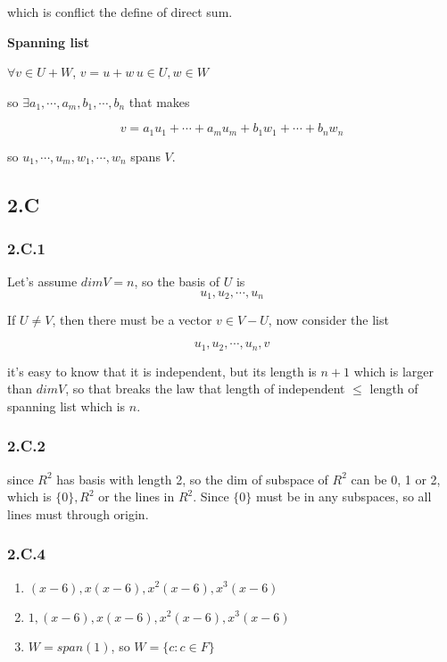 which is conflict the define of direct sum.

\textbf{Spanning list}

$\forall v\in U+W$, $v = u+w\, u\in U, w\in W$

so $\exists a_{1},\cdots,a_{m}, b_{1},\cdots, b_{n}$ that makes

\[ v = a_{1}u_{1}+\cdots+a_{m}u_{m} + b_{1}w_{1} + \cdots +b_{n}w_{n}\]

so $u_{1},\cdots, u_{m}, w_{1}, \cdots,w_{n}$ spans $V$.

\subsection*{2.C}
\subsubsection*{2.C.1}

Let's assume $dim V = n$, so the basis of $U$ is 
\[u_{1}, u_{2}, \cdots, u_{n}\]

If $U\neq V$, then there must be a vector $v\in V-U$, now consider the list

\[u_{1}, u_{2}, \cdots, u_{n}, v\]

it's easy to know that it is independent, but its length is $n+1$ which is larger than $dim V$, so that breaks the law that length of independent $\leq$ length of spanning list which is $n$.

\subsubsection*{2.C.2}

since $R^{2}$ has basis with length 2, so the dim of subspace of $R^{2}$ can be 0, 1 or 2, which is $\{0\}, R^{2}$ or the lines in $R^{2}$. Since $\{0\}$ must be in any subspaces, so all lines must through origin.

\subsubsection*{2.C.4}
\begin{enumerate}[label=(\alph*)]
\item $(x-6), x(x-6), x^{2}(x-6), x^{3}(x-6)$

\item $1, (x-6), x(x-6), x^{2}(x-6), x^{3}(x-6)$
\item $W = span(1)$, so $W=\{c:c \in F\}$
\end{enumerate}

